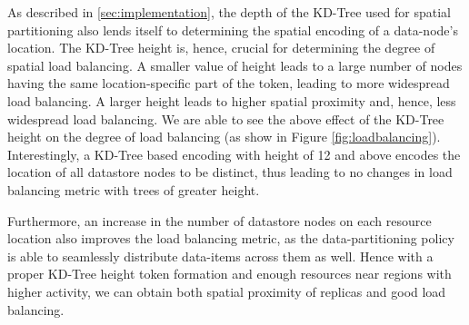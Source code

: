 \par As described in \cref{sec:implementation}, the depth of the KD-Tree used for spatial partitioning also lends itself to determining the spatial encoding of a data-node's location. The KD-Tree height is, hence, crucial for determining the degree of spatial load balancing. A smaller value of height leads to a large number of nodes having the same location-specific part of the token, leading to more widespread load balancing. A larger height leads to higher spatial proximity and, hence, less widespread load balancing. We are able to see the above effect of the KD-Tree height on the degree of load balancing (as show in Figure \ref{fig:loadbalancing}). Interestingly, a KD-Tree based encoding with height of 12 and above encodes the location of all datastore nodes to be distinct, thus leading to no changes in load balancing metric with trees of greater height. 
\par Furthermore, an increase in the number of datastore nodes on each resource location also improves the load balancing metric, as the data-partitioning policy is able to seamlessly distribute data-items across them as well.  Hence with a proper KD-Tree height token formation and enough resources near regions with higher activity, we can obtain both spatial proximity of replicas and good load balancing.


